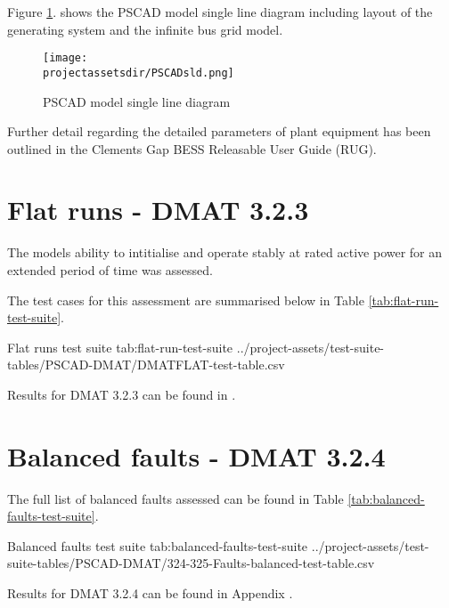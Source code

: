 \documentclass{../grid-link-report}
\newcommand{\projectassetsdir}{../project-assets}
\begin{document}
	Figure \ref{fig:PSCADmodelSLD}. shows the PSCAD model single line diagram including layout of the generating system and the infinite bus grid model.
	
	\begin{figure}[H]
		\centering
		\texttt{[image: \\projectassetsdir/PSCADsld.png]}
		\caption{PSCAD model single line diagram}
		\label{fig:PSCADmodelSLD}
	\end{figure}
	
	Further detail regarding the detailed parameters of plant equipment has been outlined in the Clements Gap BESS Releasable User Guide (RUG)\cite{pscad-rug}.
	
	
	\section{Flat runs - DMAT 3.2.3}
	The models ability to intitialise and operate stably at rated active power for an extended period of time was assessed.
	
	The test cases for this assessment are summarised below in Table \ref{tab:flat-run-test-suite}.
	
	{
		\fontsize{7}{9}\selectfont
		\autoscaledlongtable
		{Flat runs test suite}
		{tab:flat-run-test-suite}
		{\projectassetsdir/test-suite-tables/PSCAD-DMAT/DMATFLAT-test-table.csv}
	}
	
	Results for DMAT 3.2.3 can be found in .
	
	\section{Balanced faults - DMAT 3.2.4}
	\label{sec:balanced-faults}
	
	
	The full list of balanced faults assessed can be found in Table \ref{tab:balanced-faults-test-suite}.
	
	{
		\fontsize{6}{8}\selectfont
		\autoscaledlongtable
		{Balanced faults test suite}
		{tab:balanced-faults-test-suite}
		{\projectassetsdir/test-suite-tables/PSCAD-DMAT/324-325-Faults-balanced-test-table.csv}
	}
	
	Results for DMAT 3.2.4 can be found in Appendix .
	
\end{document}
